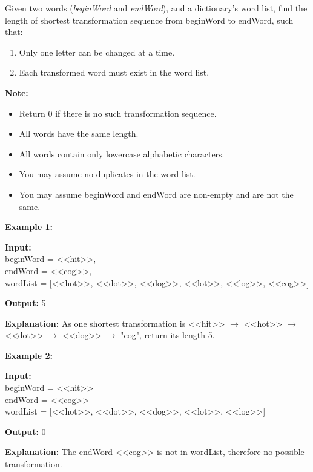 \documentclass[a4paper]{article}
\begin{document}
Given two words (\textit{beginWord} and \textit{endWord}), and a dictionary's word list, find the length of shortest transformation sequence from beginWord to endWord, such that:

\begin{enumerate}
\item Only one letter can be changed at a time.
\item Each transformed word must exist in the word list.
\end{enumerate}

\textbf{Note:}

\begin{itemize}
\item Return $0$ if there is no such transformation sequence.
\item All words have the same length.
\item All words contain only lowercase alphabetic characters.
\item You may assume no duplicates in the word list.
\item You may assume beginWord and endWord are non-empty and are not the same.
\end{itemize}



\SPACE

\textbf{Example 1:}

\textbf{Input:}\\
beginWord = <<hit>>,\\
endWord = <<cog>>,\\
wordList = [<<hot>>, <<dot>>, <<dog>>, <<lot>>, <<log>>, <<cog>>]

\textbf{Output:} 5

\textbf{Explanation:} As one shortest transformation is <<hit>> $\rightarrow$ <<hot>> $\rightarrow$ <<dot>> $\rightarrow$ <<dog>> $\rightarrow$ "cog",
return its length 5.\\

\SPACE


\textbf{Example 2:}

\textbf{Input:}\\
beginWord = <<hit>>\\
endWord = <<cog>>\\
wordList = [<<hot>>, <<dot>>, <<dog>>, <<lot>>, <<log>>]

\textbf{Output:} 0

\textbf{Explanation:} The endWord <<cog>> is not in wordList, therefore no possible transformation.
\end{document}
